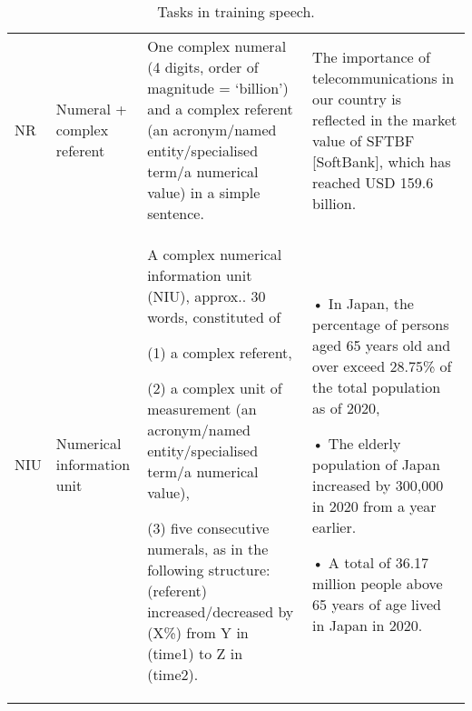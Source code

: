 \begin{sidewaystable}
\begin{tabularx}{\textwidth}{l>{\raggedright\arraybackslash}p{}QQ}
NR                   & Numeral + complex referent                                           & One complex numeral (4 digits, order of magnitude = ‘billion’) and a complex referent (an acronym\slash named entity\slash specialised term\slash a numerical value) in a simple sentence.                                                                                                                                                                                                                                 & The importance of telecommunications in our country is reflected in the market  value of SFTBF {[}SoftBank{]}, which has reached USD 159.6 billion.                                                                                                                                                                                                                                                                                                                               \\ \tablevspace

NIU                  & Numerical information unit                                         & A complex numerical information unit (NIU), approx.. 30 words, constituted of 

(1) a complex referent, 

(2) a   complex unit of measurement (an acronym\slash named entity\slash specialised term\slash a   numerical value),

(3) five consecutive numerals, as in the following structure: (referent) increased/decreased by (X\%) from Y in (time1) to Z in (time2).                                            & • In Japan, the percentage of persons aged 65 years old and over exceed 28.75\% of the total population as of 2020, 

• The elderly population of Japan increased by 300,000 in 2020 from a year earlier. 

• A total of 36.17 million people above 65 years of age lived in Japan in 2020.                                                                                                                                                                                    \\ \midrule
\end{tabularx}
\caption{Tasks in training speech.}
\label{tab:appendix2}
\end{sidewaystable}

